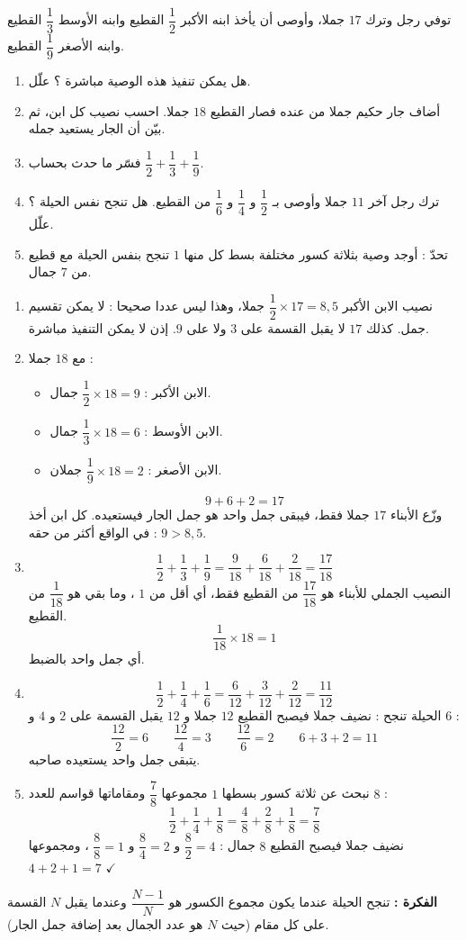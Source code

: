 \documentclass[12pt,a4paper]{article}
\begin{document}
\begin{corr}[title={وصية الجِمال}, stars=4, source={Axiomaths}]
توفي رجل وترك $17$ جملا، وأوصى أن يأخذ ابنه الأكبر $\dfrac{1}{2}$ القطيع وابنه الأوسط $\dfrac{1}{3}$ القطيع وابنه الأصغر $\dfrac{1}{9}$ القطيع.
\begin{enumerate}
  \item هل يمكن تنفيذ هذه الوصية مباشرة ؟ علّل.
  \item أضاف جار حكيم جملا من عنده فصار القطيع $18$ جملا. احسب نصيب كل ابن، ثم بيّن أن الجار يستعيد جمله.
  \item فسّر ما حدث بحساب $\dfrac{1}{2}+\dfrac{1}{3}+\dfrac{1}{9}$.
  \item ترك رجل آخر $11$ جملا وأوصى بـ $\dfrac{1}{2}$ و $\dfrac{1}{4}$ و $\dfrac{1}{6}$ من القطيع. هل تنجح نفس الحيلة ؟ علّل.
  \item تحدّ : أوجد وصية بثلاثة كسور مختلفة بسط كل منها $1$ تنجح بنفس الحيلة مع قطيع من $7$ جمال.
\end{enumerate}
\axsol
\begin{enumerate}[itemsep=14pt]
  \item نصيب الابن الأكبر $\dfrac{1}{2}\times17=8{,}5$ جملا، وهذا ليس عددا صحيحا : لا يمكن تقسيم جمل.
  كذلك $17$ لا يقبل القسمة على $3$ ولا على $9$. إذن لا يمكن التنفيذ مباشرة.
  \item مع $18$ جملا :
  \begin{itemize}[itemsep=6pt]
    \item الابن الأكبر : $\dfrac{1}{2}\times18=9$ جمال.
    \item الابن الأوسط : $\dfrac{1}{3}\times18=6$ جمال.
    \item الابن الأصغر : $\dfrac{1}{9}\times18=2$ جملان.
  \end{itemize}
  \[9+6+2=17\]
  وزّع الأبناء $17$ جملا فقط، فيبقى جمل واحد هو جمل الجار فيستعيده.
  كل ابن أخذ في الواقع أكثر من حقه : $9>8{,}5$.
  \item
  \[\dfrac{1}{2}+\dfrac{1}{3}+\dfrac{1}{9}=\dfrac{9}{18}+\dfrac{6}{18}+\dfrac{2}{18}=\dfrac{17}{18}\]
  النصيب الجملي للأبناء هو $\dfrac{17}{18}$ من القطيع فقط، أي أقل من $1$ ، وما بقي هو $\dfrac{1}{18}$ من القطيع.
  \[\dfrac{1}{18}\times18=1\]
  أي جمل واحد بالضبط.
  \item
  \[\dfrac{1}{2}+\dfrac{1}{4}+\dfrac{1}{6}=\dfrac{6}{12}+\dfrac{3}{12}+\dfrac{2}{12}=\dfrac{11}{12}\]
  الحيلة تنجح : نضيف جملا فيصبح القطيع $12$ جملا و $12$ يقبل القسمة على $2$ و $4$ و $6$ :
  \[\dfrac{12}{2}=6\qquad\dfrac{12}{4}=3\qquad\dfrac{12}{6}=2\qquad 6+3+2=11\]
  يتبقى جمل واحد يستعيده صاحبه.
  \item نبحث عن ثلاثة كسور بسطها $1$ مجموعها $\dfrac{7}{8}$ ومقاماتها قواسم للعدد $8$ :
  \[\dfrac{1}{2}+\dfrac{1}{4}+\dfrac{1}{8}=\dfrac{4}{8}+\dfrac{2}{8}+\dfrac{1}{8}=\dfrac{7}{8}\]
  نضيف جملا فيصبح القطيع $8$ جمال : $\dfrac{8}{2}=4$ و $\dfrac{8}{4}=2$ و $\dfrac{8}{8}=1$ ، ومجموعها $4+2+1=7$ $\checkmark$
\end{enumerate}
\textbf{الفكرة :} تنجح الحيلة عندما يكون مجموع الكسور هو $\dfrac{N-1}{N}$ وعندما يقبل $N$ القسمة على كل مقام (حيث $N$ هو عدد الجمال بعد إضافة جمل الجار).
\end{corr}
\end{document}

